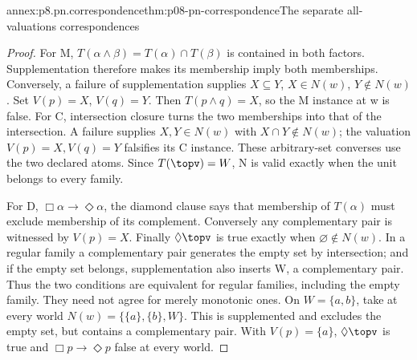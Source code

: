 \begin{annexitem}{annex:p8.pn.correspondence}{thm:p08-pn-correspondence}{The separate all-valuations correspondences}
\begin{proof}
For M, \(T(\alpha\land\beta)=T(\alpha)\cap T(\beta)\)
is contained in both factors. Supplementation therefore makes
its membership imply both memberships. Conversely, a failure of
supplementation supplies \(X\subseteq Y\), \(X\in N(w)\),
\(Y\notin N(w)\). Set \(V(p)=X\), \(V(q)=Y\).
Then \(T(p\land q)=X\), so the M instance at w is false.
For C, intersection closure turns the two memberships into that
of the intersection. A failure supplies \(X,Y\in N(w)\)
with \(X\cap Y\notin N(w)\); the valuation
\(V(p)=X,V(q)=Y\) falsifies its C instance. These arbitrary-set
converses use the two declared atoms. Since \(T(\topv)=W\),
N is valid exactly when the unit belongs to every family.

For D, \(\Box\alpha\to\Diamond\alpha\), the diamond
clause says that membership of \(T(\alpha)\) must exclude
membership of its complement. Conversely any complementary pair
is witnessed by \(V(p)=X\). Finally
\(\Diamond\topv\) is true exactly when \(\varnothing\notin N(w)\).
In a regular family a complementary pair generates the empty set
by intersection; and if the empty set belongs, supplementation
also inserts W, a complementary pair. Thus the two conditions
are equivalent for regular families, including the empty family.
They need not agree for merely monotonic ones. On
\(W=\{a,b\}\), take at every world
\(N(w)=\{\{a\},\{b\},W\}\). This is supplemented and
excludes the empty set, but contains a complementary pair.
With \(V(p)=\{a\}\), \(\Diamond\topv\) is true and
\(\Box p\to\Diamond p\) false at every world.
\end{proof}
\end{annexitem}

